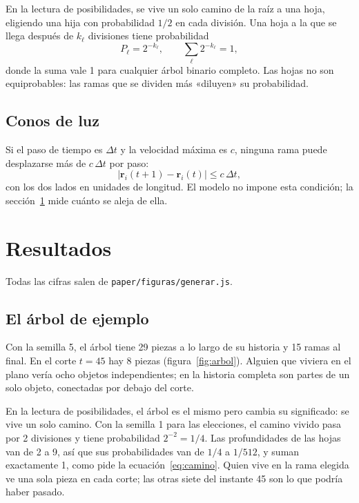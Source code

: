 \documentclass[11pt,a4paper]{article}
\begin{document}
En la lectura de posibilidades, se vive un solo camino de la raíz a una hoja, eligiendo una hija con probabilidad $1/2$ en cada división. Una hoja a la que se llega después de $k_\ell$ divisiones tiene probabilidad
\begin{equation}\label{eq:camino}
P_\ell = 2^{-k_\ell}, \qquad \sum_\ell 2^{-k_\ell} = 1 ,
\end{equation}
donde la suma vale 1 para cualquier árbol binario completo. Las hojas no son equiprobables: las ramas que se dividen más «diluyen» su probabilidad.

\subsection{Conos de luz}

Si el paso de tiempo es $\Delta t$ y la velocidad máxima es $c$, ninguna rama puede desplazarse más de $c\,\Delta t$ por paso:
\begin{equation}\label{eq:cono}
|\mathbf r_i(t+1) - \mathbf r_i(t)| \le c\,\Delta t ,
\end{equation}
con los dos lados en unidades de longitud. El modelo no impone esta condición; la sección~\ref{sec:resultados} mide cuánto se aleja de ella.

\section{Resultados}\label{sec:resultados}

Todas las cifras salen de \texttt{paper/figuras/generar.js}.

\subsection{El árbol de ejemplo}

Con la semilla 5, el árbol tiene 29 piezas a lo largo de su historia y 15 ramas al final. En el corte $t = 45$ hay 8 piezas (figura~\ref{fig:arbol}). Alguien que viviera en el plano vería ocho objetos independientes; en la historia completa son partes de un solo objeto, conectadas por debajo del corte.

En la lectura de posibilidades, el árbol es el mismo pero cambia su significado: se vive un solo camino. Con la semilla 1 para las elecciones, el camino vivido pasa por 2 divisiones y tiene probabilidad $2^{-2} = 1/4$. Las profundidades de las hojas van de 2 a 9, así que sus probabilidades van de $1/4$ a $1/512$, y suman exactamente 1, como pide la ecuación~\eqref{eq:camino}. Quien vive en la rama elegida ve una sola pieza en cada corte; las otras siete del instante 45 son lo que podría haber pasado.
\end{document}
